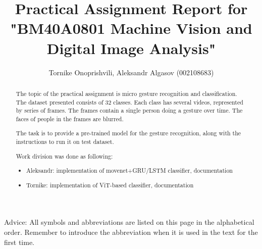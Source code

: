 \documentclass{lutmscthesis}[2017/10/03]
\title{Practical Assignment Report for "BM40A0801 Machine Vision and Digital Image Analysis"}
\author{Tornike Onoprishvili, Aleksandr Algasov (002108683)}
\begin{document}

\maketitle
\newpage

\begin{abstract}

The topic of the practical assignment is micro gesture recognition and classification. The dataset presented consists of 32 classes. Each class has several videos, represented by series of frames. The frames contain a single person doing a gesture over time. The faces of people in the frames are blurred.

The task is to provide a pre-trained model for the gesture recognition, along with the instructions to run it on test dataset.

Work division was done as following:

\begin{itemize}
    \item Aleksandr: implementation of movenet+GRU/LSTM classifier, documentation
    \item Tornike: implementation of ViT-based classifier, documentation
\end{itemize}

\end{abstract}




\renewcommand\refname{REFERENCES}
\renewcommand\contentsname{CONTENTS}

\pagestyle{masters}
\newpage



\tableofcontents



\glsnogroupskiptrue
\setlength{\glsdescwidth}{1.0\hsize}
\printglossary[title=LIST OF ABBREVIATIONS,type=\acronymtype, style=long, nonumberlist, nopostdot]

Advice: All symbols and abbreviations are listed on this page in the alphabetical order. 
Remember to introduce the abbreviation when it is used in the text for the first time.\\
\end{document}
